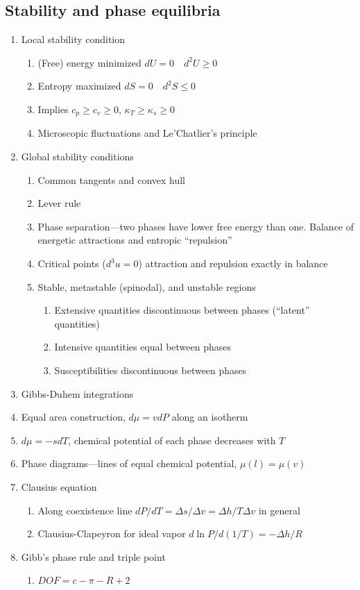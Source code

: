 \documentclass[11pt]{article}
\begin{document}
\subsection{Stability and phase equilibria}
\label{sec:orgcddbf7d}
\begin{enumerate}
\item Local stability condition
\begin{enumerate}
\item (Free) energy minimized \(dU=0\quad d^2U \geq 0\)
\item Entropy maximized \(dS = 0\quad d^2S \leq 0\)
\item Implies \(c_p \geq c_v \geq 0\), \(\kappa_T \geq \kappa_s \geq 0\)
\item Microscopic fluctuations and Le'Chatlier's principle
\end{enumerate}

\item Global stability conditions
\begin{enumerate}
\item Common tangents and convex hull
\item Lever rule
\item Phase separation---two phases have lower free energy
than one.  Balance of energetic attractions and entropic ``repulsion''
\item Critical points (\(d^3u = 0\)) attraction and repulsion
exactly in balance
\item Stable, metastable (spinodal), and unstable regions
\begin{enumerate}
\item Extensive quantities discontinuous between phases (``latent'' quantities)
\item Intensive quantities equal between phases
\item Susceptibilities discontinuous between phases
\end{enumerate}
\end{enumerate}

\item Gibbs-Duhem integrations
\item Equal area construction, \(d\mu = vdP\) along an isotherm
\item \(d\mu = - s dT\), chemical potential of each phase decreases with \(T\)
\item Phase diagrams---lines of equal chemical potential, \(\mu(l)=\mu(v)\)
\item Clausius equation
\begin{enumerate}
\item Along coexistence line \(dP/dT = \Delta s/\Delta v = \Delta
      h/T\Delta v\) in general
\item Clausius-Clapeyron for ideal vapor \(d\ln P/d(1/T) = -\Delta h/R\)
\end{enumerate}

\item Gibb's phase rule and triple point
\begin{enumerate}
\item \(DOF = c -\pi - R + 2\)
\end{enumerate}
\end{enumerate}
\end{document}

